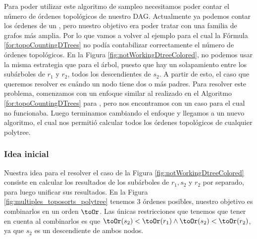 Para poder utilizar este algoritmo de sampleo necesitamos poder contar el número de órdenes topológicos de nuestro DAG. Actualmente ya podemos contar los órdenes de un \dtree{}, pero nuestro objetivo era poder tratar con una familia de grafos más amplia. Por lo que vamos a volver al ejemplo para el cual la Fórmula \ref{for:topoCountingDTrees} no podía contabilizar correctamente el número de órdenes topológicos. En la Figura \ref{fig:notWorkingDtreeColored}, no podemos usar la misma estrategia que para el árbol, puesto que hay un solapamiento entre los subárboles de $r_1$ y $r_2$, todos los descendientes de $s_2$. A partir de esto, el caso que queremos resolver es cuándo un nodo tiene dos o más padres. Para resolver este problema, comenzamos con un enfoque similar al realizado en el Algoritmo \ref{for:topoCountingDTrees} para \dtrees, pero nos encontramos con un caso para el cual no funcionaba. Luego terminamos cambiando el enfoque y llegamos a un nuevo algoritmo, el cual nos permitió calcular todos los órdenes topológicos de cualquier polytree.   

\subsubsection{Idea inicial}

Nuestra idea para el resolver el caso de la Figura \ref{fig:notWorkingDtreeColored} consiste en calcular los resultados de los subárboles de $r_1,s_2$ y  $r_2$ por separado, para luego unificar sus resultados. En la Figura \ref{fig:multiples_toposorts_polytree} tenemos 3 órdenes posibles, nuestro objetivo es combinarlos en un orden $\toOr$. Las únicas restricciones que tenemos que tener en cuenta al combinarlos es que $\toOr(s_2) < \toOr(r_1) \land \toOr(s_2) < \toOr(r_2)$, ya que $s_2$ es un descendiente de ambos nodos. 

